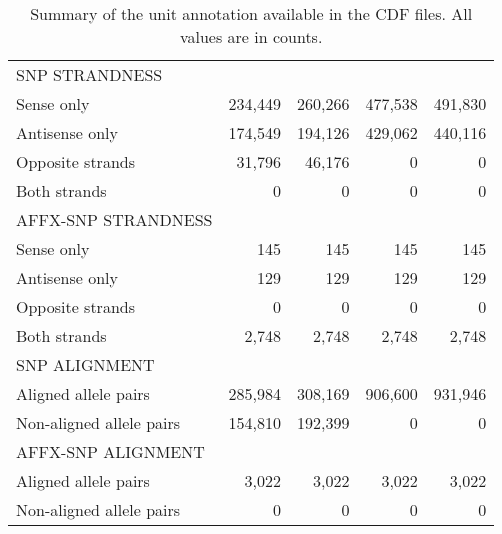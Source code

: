 \documentclass[10pt,a4paper]{article}
\begin{document}
\begin{table}[hp]
\begin{center}
\begin{tabular}{|l|rr||rr|}
\hline									            						             
SNP STRANDNESS					&	  				&	  				&	 				   &	 		     \\
Sense only              &  234,449  &  260,266  &   477,538 &    491,830 \\
Antisense only          &  174,549  &  194,126  &   429,062  &   440,116 \\
Opposite strands        &   31,796  &   46,176  &         0  &         0 \\
Both strands            &        0  &        0  &         0  &         0 \\
\hline									            						             
AFFX-SNP STRANDNESS 		&	  				&	  				&	 				   &	 		     \\
Sense only              &      145  &      145  &       145  &       145 \\
Antisense only          &      129  &      129  &       129  &       129 \\
Opposite strands        &        0  &        0  &         0  &         0 \\
Both strands            &    2,748  &    2,748  &     2,748  &     2,748 \\
\hline									            						             
SNP ALIGNMENT	           &	  			 &           &	 		      &	 		      \\
Aligned allele pairs     &  285,984  &  308,169  &   906,600  &   931,946 \\
Non-aligned allele pairs &  154,810  &  192,399  &         0  &         0 \\
\hline									            						             
AFFX-SNP ALIGNMENT	     &	  			 &	  				&	 		       &	 		      \\
Aligned allele pairs     &    3,022  &    3,022  &    3,022  &     3,022  \\
Non-aligned allele pairs &        0  &        0  &        0  &         0  \\
\hline									            						             
\end{tabular}
\end{center}
\caption{Summary of the unit annotation available in the CDF files.  All values are in counts.}  %
\label{tblCdfUnits}
\end{table}


\clearpage
\end{document}
